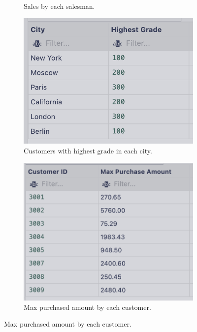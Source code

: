 \begin{figure}[H]
\begin{subfigure}{.5\textwidth}
        \caption*{Sales by each salesman.}
        \label{fig:q2}
    \end{subfigure}
    \begin{subfigure}{.5\textwidth}
        \centering
        \includegraphics[width=.8\linewidth]{images/output/q3.png}
        \caption*{Customers with highest grade in each city.}
        \label{fig:q3}
    \end{subfigure}
    \begin{subfigure}{.5\textwidth}
        \centering
        \includegraphics[width=.8\linewidth]{images/output/q4.png}
        \caption*{Max purchased amount by each customer.}
        \label{fig:q4}
    \end{subfigure}
\end{figure}
